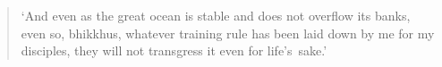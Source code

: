 \clearpage
\thispagestyle{empty}

\mbox{}
\vfill

\begin{quote}
`And even as the great ocean
is stable and does not overflow its banks,
even so, bhikkhus, whatever training
rule has been laid down by me for my disciples,
they will not transgress it even for life's~sake.'

\end{quote}

\vfill
\mbox{}

